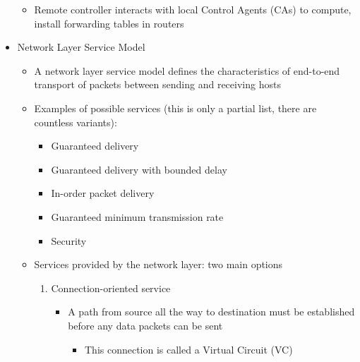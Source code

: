 \begin{itemize}
\begin{itemize}
      \item Remote controller interacts with local Control Agents (CAs) to compute, install forwarding tables in routers

    \end{itemize}

  \item Network Layer Service Model

    \begin{itemize}

      \item A network layer service model defines the characteristics of end-to-end transport of packets between sending and receiving hosts

      \item Examples of possible services (this is only a partial list, there are countless variants):

        \begin{itemize}

          \item Guaranteed delivery

          \item Guaranteed delivery with bounded delay

          \item In-order packet delivery

          \item Guaranteed minimum transmission rate

          \item Security

        \end{itemize}

      \item Services provided by the network layer: two main options

        \begin{enumerate}

          \item Connection-oriented service

            \begin{itemize}

              \item A path from source all the way to destination must be established before any data packets can be sent

                \begin{itemize}

                  \item This connection is called a Virtual Circuit (VC)


\end{itemize}
\end{itemize}
\end{enumerate}
\end{itemize}
\end{itemize}
